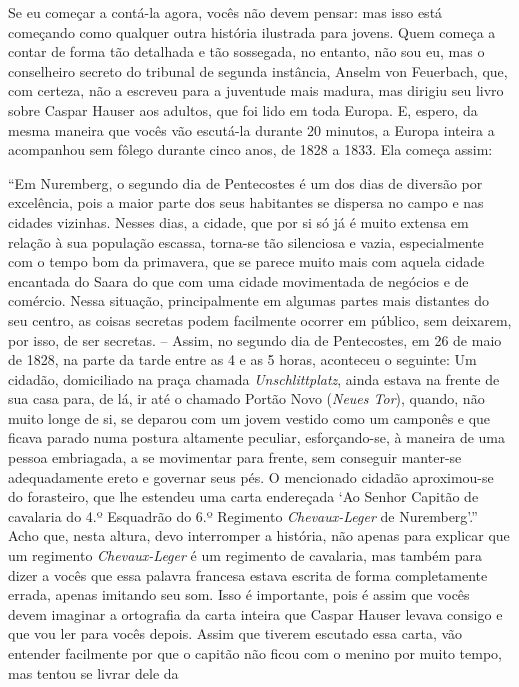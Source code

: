 Se eu começar a contá-la agora, vocês não devem pensar: mas isso está
começando como qualquer outra história ilustrada para jovens. Quem
começa a contar de forma tão detalhada e tão sossegada, no entanto, não
sou eu, mas o conselheiro secreto do tribunal de segunda instância,
Anselm von Feuerbach, que, com certeza, não a escreveu para a juventude
mais madura, mas dirigiu seu livro sobre Caspar Hauser aos adultos, que
foi lido em toda Europa. E, espero, da mesma maneira que vocês vão
escutá-la durante 20 minutos, a Europa inteira a acompanhou sem fôlego
durante cinco anos, de 1828 a 1833. Ela começa assim:

``Em Nuremberg, o segundo dia de Pentecostes é um dos dias de diversão
por excelência, pois a maior parte dos seus habitantes se dispersa no
campo e nas cidades vizinhas. Nesses dias, a cidade, que por si só já é
muito extensa em relação à sua população escassa, torna-se tão
silenciosa e vazia, especialmente com o tempo bom da primavera, que se
parece muito mais com aquela cidade encantada do Saara do que com uma
cidade movimentada de negócios e de comércio. Nessa situação,
principalmente em algumas partes mais distantes do seu centro, as coisas
secretas podem facilmente ocorrer em público, sem deixarem, por isso, de
ser secretas. -- Assim, no segundo dia de Pentecostes, em 26 de maio de
1828, na parte da tarde entre as 4 e as 5 horas, aconteceu o seguinte:
Um cidadão, domiciliado na praça chamada \emph{Unschlittplatz}, ainda
estava na frente de sua casa para, de lá, ir até o chamado Portão Novo
(\emph{Neues Tor}), quando, não muito longe de si, se deparou com um
jovem vestido como um camponês e que ficava parado numa postura
altamente peculiar, esforçando-se, à maneira de uma pessoa embriagada, a
se movimentar para frente, sem conseguir manter-se adequadamente ereto e
governar seus pés. O mencionado cidadão aproximou-se do forasteiro, que
lhe estendeu uma carta endereçada `Ao Senhor Capitão de cavalaria do 4.º
Esquadrão do 6.º Regimento \emph{Chevaux-Leger} de Nuremberg'.'' Acho
que, nesta altura, devo interromper a história, não apenas para explicar
que um regimento \emph{Chevaux-Leger} é um regimento de cavalaria, mas
também para dizer a vocês que essa palavra francesa estava escrita de
forma completamente errada, apenas imitando seu som. Isso é importante,
pois é assim que vocês devem imaginar a ortografia da carta inteira que
Caspar Hauser levava consigo e que vou ler para vocês depois. Assim que
tiverem escutado essa carta, vão entender facilmente por que o capitão
não ficou com o menino por muito tempo, mas tentou se livrar dele da
